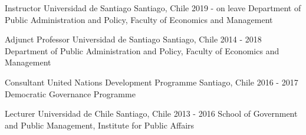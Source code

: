 





\begin{cventries}
\cventry
{Instructor} 
{Universidad de Santiago} 
{Santiago, Chile} 
{2019 - on leave}
{Department of Public Administration and Policy, Faculty of Economics and Management}\vspace{1.5mm}

\cventry
{Adjunct Professor} 
{Universidad de Santiago} 
{Santiago, Chile} 
{2014 - 2018}
{Department of Public Administration and Policy, Faculty of Economics and Management} \vspace{1.5mm}

\cventry
{Consultant} 
{United Nations Development Programme} 
{Santiago, Chile} 
{2016 - 2017}
{Democratic Governance Programme} \vspace{1.5mm}

\cventry
{Lecturer} 
{Universidad de Chile} 
{Santiago, Chile} 
{2013 - 2016}
{School of Government and Public Management, Institute for Public Affairs}\vspace{1.5mm}

\end{cventries}
